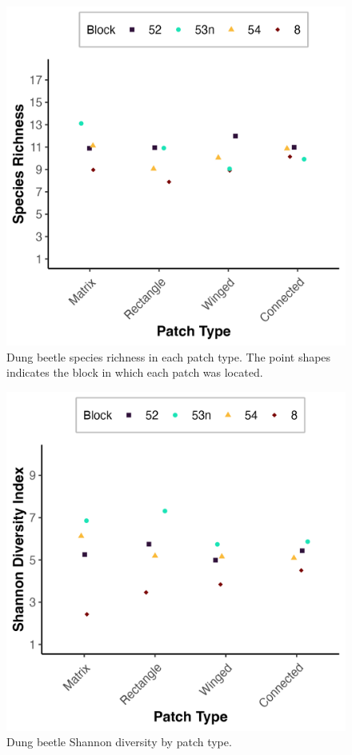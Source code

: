 \documentclass[
  man, donotrepeattitle]{apa6}
\begin{document}
\newpage

\begin{figure}[H]

{\centering \includegraphics[width=0.7\linewidth,]{images/sp_richness_patches} 

}

\caption{Dung beetle species richness in each patch type. The point shapes indicates the block in which each patch was located.}\label{fig:richness}
\end{figure}

\newpage

\begin{figure}[H]

{\centering \includegraphics[width=0.7\linewidth,]{images/sp_shannon_patches} 

}

\caption{Dung beetle Shannon diversity by patch type.}\label{fig:shannon}
\end{figure}
\end{document}

